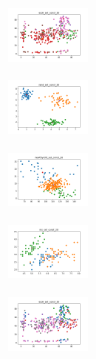 \begin{figure}[H]
\begin{subfigure}
    \end{subfigure}
    \hfill
    \begin{subfigure}
        \centering
        \includegraphics[width=0.234\textwidth]{img/aggun/ecoli_set_const_20_589741062_clust.png}
    \end{subfigure}
    \hfill
    \begin{subfigure}
        \centering
        \includegraphics[width=0.234\textwidth]{img/aggun/rand_set_const_20_589741062_clust.png}
    \end{subfigure}
    \hfill
    \begin{subfigure}
        \centering
        \includegraphics[width=0.234\textwidth]{img/aggun/newthyroid_set_const_20_589741062_clust.png}
    \end{subfigure}
    \hfill
    \begin{subfigure}
        \centering
        \includegraphics[width=0.234\textwidth]{img/aggun/iris_set_const_20_277451237_clust.png}
    \end{subfigure}
    \hfill
    \begin{subfigure}
        \centering
        \includegraphics[width=0.234\textwidth]{img/aggun/ecoli_set_const_20_277451237_clust.png}
    \end{subfigure}
    \hfill

\end{figure}
